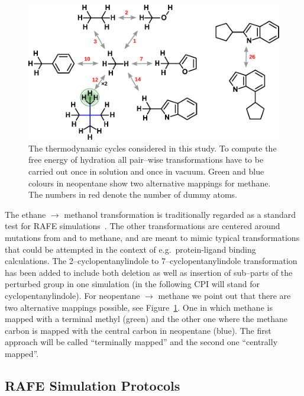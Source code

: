 \documentclass[journal=jctcce,manuscript=article]{achemso}
\begin{document}
\begin{figure}[ht]
  \includegraphics[scale=1.0]{figures/cycles.pdf}
  \caption{The thermodynamic cycles considered in this study.  To
    compute the free energy of hydration all pair--wise
    transformations have to be carried out once in solution and once
    in vacuum.  Green and blue colours in neopentane show two
    alternative mappings for methane.  The numbers in red denote the
    number of dummy atoms.}
  \label{fig:cycles}
\end{figure}

The ethane $\rightarrow$ methanol transformation is traditionally
regarded as a standard test for RAFE
simulations~\cite{doi:10.1063/1.449208, doi:10.1021/jp981629f}.   The
other transformations are centered around mutations from and to
methane, and are meant to mimic typical transformations that could be attempted
in the context of e.g.\ protein-ligand binding calculations. The 
2--cyclopentanylindole to 7--cyclopentanylindole
transformation has been added to include both deletion as well as
insertion of sub--parts of the perturbed group in one simulation (in the 
following CPI will stand for cyclopentanylindole).  For
neopentane $\rightarrow$ methane we point out that there are two
alternative mappings possible, see Figure~\ref{fig:cycles}.  One in
which methane is mapped with a terminal methyl (green) and the other
one where the methane carbon is mapped with the central carbon in
neopentane (blue).  The first approach will be called ``terminally mapped'' and 
the second one ``centrally mapped''.


\subsection{RAFE Simulation Protocols}
\label{sec:rafe_protocols}
\end{document}
